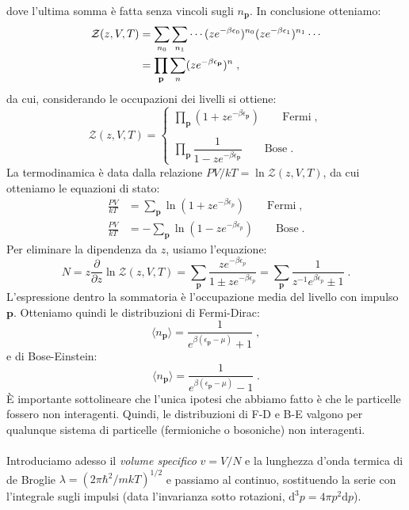 \documentclass[10pt,a4paper]{report}
\theoremstyle{definition}
\numberwithin{equation}{section}
\newcommand{\diff}[1][]{\mathrm{d}#1}
\newcommand{\bra}{\langle}
\newcommand{\ket}{\rangle}
\newcommand{\zpart}{\mathcal{Z}}
\begin{document}
dove l'ultima somma è fatta senza vincoli sugli $n_{\mathbf{p}}$. In conclusione otteniamo:
\begin{align}
\zpart(z,V,T) &= \sum_{n_0}\sum_{n_1}\cdots (ze^{-\beta\epsilon_0})^{n_0}(ze^{-\beta\epsilon_1})^{n_1}\cdots \notag \\
&= \prod_{\mathbf{p}}\sum_n (ze^{-\beta\epsilon_{\mathbf{p}}})^n\;,
\end{align}
da cui, considerando le occupazioni dei livelli si ottiene:
\begin{equation}
\zpart(z,V,T)=\begin{cases}
\prod_{\mathbf{p}}(1+ze^{-\beta\epsilon_{\mathbf{p}}})\qquad \mbox{Fermi}\;, \\
\\
\prod_{\mathbf{p}}\dfrac{1}{1-ze^{-\beta\epsilon_{\mathbf{p}}}}\qquad \mbox{Bose}\;.
\end{cases}
\end{equation}
La termodinamica è data dalla relazione $PV/kT=\ln\zpart(z,V,T)$, da cui otteniamo le equazioni di stato:
\begin{align}
\frac{PV}{kT} &= \sum_{\mathbf{p}}\ln(1+ze^{-\beta\epsilon_p})\qquad \mbox{Fermi}\;, \\
\frac{PV}{kT} &= -\sum_{\mathbf{p}}\ln(1-ze^{-\beta\epsilon_p})\qquad \mbox{Bose}\;.
\end{align}
Per eliminare la dipendenza da $z$, usiamo l'equazione:
\begin{equation}
N=z\frac{\partial}{\partial z}\ln\zpart(z,V,T)=\sum_{\mathbf{p}}\frac{ze^{-\beta\epsilon_p}}{1\pm ze^{-\beta\epsilon_p}}=\sum_{\mathbf{p}}\frac{1}{z^{-1}e^{\beta\epsilon_p}\pm 1}\;.
\end{equation}
L'espressione dentro la sommatoria è l'occupazione media del livello con impulso $\mathbf{p}$. Otteniamo quindi le distribuzioni di Fermi-Dirac:
\begin{equation}
\bra n_{\mathbf{p}}\ket =\frac{1}{e^{\beta(\epsilon_{\mathbf{p}}-\mu)}+1}\;,
\end{equation}
e di Bose-Einstein:
\begin{equation}
\bra n_{\mathbf{p}}\ket=\frac{1}{e^{\beta(\epsilon_{\mathbf{p}}-\mu)}-1}\;.
\end{equation}
È importante sottolineare che l'unica ipotesi che abbiamo fatto è che le particelle fossero non interagenti. Quindi, le distribuzioni di F-D e B-E valgono per qualunque sistema di particelle (fermioniche o bosoniche) non interagenti. \\
\\
Introduciamo adesso il \emph{volume specifico} $v=V/N$ e la lunghezza d'onda termica di de Broglie $\lambda=(2\pi\hbar^2/mkT)^{1/2}$ e passiamo al continuo, sostituendo la serie con l'integrale sugli impulsi (data l'invarianza sotto rotazioni, $\diff^3{p}=4\pi p^2\diff{p}$).
\end{document}
